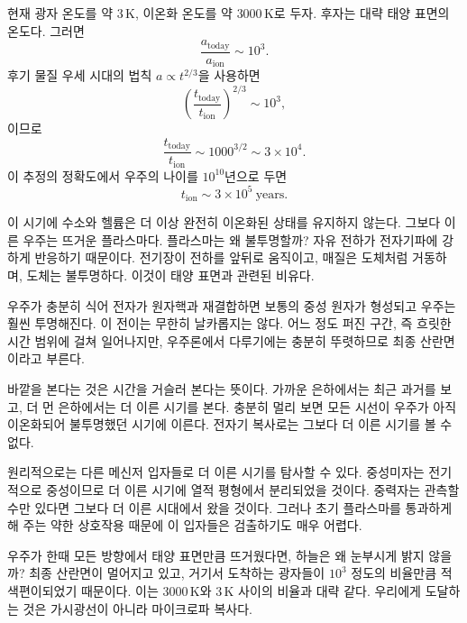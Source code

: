 현재 광자 온도를 약 \(3\,\mathrm K\), 이온화 온도를 약 \(3000\,\mathrm K\)로 두자. 후자는 대략 태양 표면의 온도다. 그러면
\begin{equation}
\frac{a_{\mathrm{today}}}{a_{\mathrm{ion}}}\sim 10^3.
\end{equation}
후기 물질 우세 시대의 법칙 \(a\propto t^{2/3}\)을 사용하면
\begin{equation}
\left(\frac{t_{\mathrm{today}}}{t_{\mathrm{ion}}}\right)^{2/3}\sim 10^3,
\end{equation}
이므로
\begin{equation}
\frac{t_{\mathrm{today}}}{t_{\mathrm{ion}}}\sim 1000^{3/2}\sim 3\times 10^4.
\end{equation}
이 추정의 정확도에서 우주의 나이를 \(10^{10}\)년으로 두면
\begin{equation}
t_{\mathrm{ion}}\sim 3\times 10^5\ \mathrm{years}.
\end{equation}

이 시기에 수소와 헬륨은 더 이상 완전히 이온화된 상태를 유지하지 않는다. 그보다 이른 우주는 뜨거운 플라스마다. 플라스마는 왜 불투명할까? 자유 전하가 전자기파에 강하게 반응하기 때문이다. 전기장이 전하를 앞뒤로 움직이고, 매질은 도체처럼 거동하며, 도체는 불투명하다. 이것이 태양 표면과 관련된 비유다.

우주가 충분히 식어 전자가 원자핵과 재결합하면 보통의 중성 원자가 형성되고 우주는 훨씬 투명해진다. 이 전이는 무한히 날카롭지는 않다. 어느 정도 퍼진 구간, 즉 흐릿한 시간 범위에 걸쳐 일어나지만, 우주론에서 다루기에는 충분히 뚜렷하므로 최종 산란면이라고 부른다.

바깥을 본다는 것은 시간을 거슬러 본다는 뜻이다. 가까운 은하에서는 최근 과거를 보고, 더 먼 은하에서는 더 이른 시기를 본다. 충분히 멀리 보면 모든 시선이 우주가 아직 이온화되어 불투명했던 시기에 이른다. 전자기 복사로는 그보다 더 이른 시기를 볼 수 없다.

원리적으로는 다른 메신저 입자들로 더 이른 시기를 탐사할 수 있다. 중성미자는 전기적으로 중성이므로 더 이른 시기에 열적 평형에서 분리되었을 것이다. 중력자는 관측할 수만 있다면 그보다 더 이른 시대에서 왔을 것이다. 그러나 초기 플라스마를 통과하게 해 주는 약한 상호작용 때문에 이 입자들은 검출하기도 매우 어렵다.

우주가 한때 모든 방향에서 태양 표면만큼 뜨거웠다면, 하늘은 왜 눈부시게 밝지 않을까? 최종 산란면이 멀어지고 있고, 거기서 도착하는 광자들이 \(10^3\) 정도의 비율만큼 적색편이되었기 때문이다. 이는 \(3000\,\mathrm K\)와 \(3\,\mathrm K\) 사이의 비율과 대략 같다. 우리에게 도달하는 것은 가시광선이 아니라 마이크로파 복사다.

